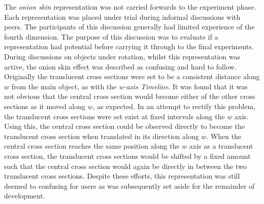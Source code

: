 \documentclass{l4proj}
\begin{document}
The \textit{onion skin} representation was not carried forwards to the experiment phase. Each representation was placed under trial during informal discussions with peers. The participants of this discussion generally had limited experience of the fourth dimension. The purpose of this discussion was to evaluate if a representation had potential before carrying it through to the final experiments. 
During discussions on objects under rotation, whilst this representation was active, the onion skin effect was described as confusing and hard to follow. 
Originally the translucent cross sections were set to be a consistent distance along \(w\) from the main object, as with the \textit{w-axis Timeline}. It was found that it was not obvious that the central cross section would become either of the other cross sections as it moved along \(w\), as expected. 
In an attempt to rectify this problem, the translucent cross sections were set exist at fixed intervals along the \(w\) axis. Using this, the central cross section could be observed directly to become the translucent cross section when translated in its direction along \(w\). When the central cross section reaches the same position along the \(w\) axis as a translucent cross section, the translucent cross sections would be shifted by a fixed amount such that the central cross section would again be directly in between the two translucent cross sections.
Despite these efforts, this representation was still deemed to confusing for users as was subsequently set aside for the remainder of development.
\end{document}
